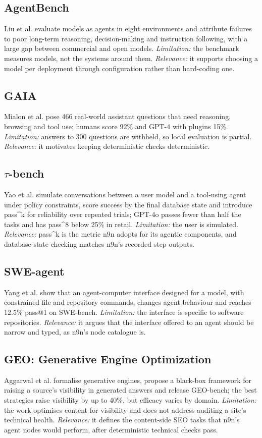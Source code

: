 \documentclass[conference]{IEEEtran}
\begin{document}
\subsection{AgentBench}
Liu et al. \cite{liu2024agentbench} evaluate models as agents in eight environments and attribute failures to poor long-term reasoning, decision-making and instruction following, with a large gap between commercial and open models. \emph{Limitation:} the benchmark measures models, not the systems around them. \emph{Relevance:} it supports choosing a model per deployment through configuration rather than hard-coding one.

\subsection{GAIA}
Mialon et al. \cite{mialon2023gaia} pose 466 real-world assistant questions that need reasoning, browsing and tool use; humans score 92\% and GPT-4 with plugins 15\%. \emph{Limitation:} answers to 300 questions are withheld, so local evaluation is partial. \emph{Relevance:} it motivates keeping deterministic checks deterministic.

\subsection{$\tau$-bench}
Yao et al. \cite{yao2024taubench} simulate conversations between a user model and a tool-using agent under policy constraints, score success by the final database state and introduce pass\^{}k for reliability over repeated trials; GPT-4o passes fewer than half the tasks and has pass\^{}8 below 25\% in retail. \emph{Limitation:} the user is simulated. \emph{Relevance:} pass\^{}k is the metric n9n adopts for its agentic components, and database-state checking matches n9n's recorded step outputs.

\subsection{SWE-agent}
Yang et al. \cite{yang2024sweagent} show that an agent-computer interface designed for a model, with constrained file and repository commands, changes agent behaviour and reaches 12.5\% pass@1 on SWE-bench. \emph{Limitation:} the interface is specific to software repositories. \emph{Relevance:} it argues that the interface offered to an agent should be narrow and typed, as n9n's node catalogue is.

\subsection{GEO: Generative Engine Optimization}
Aggarwal et al. \cite{aggarwal2024geo} formalise generative engines, propose a black-box framework for raising a source's visibility in generated answers and release GEO-bench; the best strategies raise visibility by up to 40\%, but efficacy varies by domain. \emph{Limitation:} the work optimises content for visibility and does not address auditing a site's technical health. \emph{Relevance:} it defines the content-side SEO tasks that n9n's agent nodes would perform, after deterministic technical checks pass.
\end{document}
